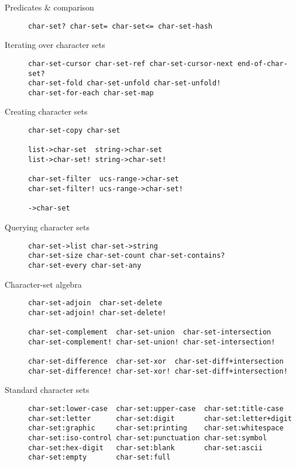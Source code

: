 \begin{description}
\item[ Predicates \& comparison ]
\begin{verbatim}
char-set? char-set= char-set<= char-set-hash
\end{verbatim}
\item[ Iterating over character sets ]
\begin{verbatim}
char-set-cursor char-set-ref char-set-cursor-next end-of-char-set? 
char-set-fold char-set-unfold char-set-unfold!
char-set-for-each char-set-map
\end{verbatim}
\item[ Creating character sets ]
\begin{verbatim}
char-set-copy char-set

list->char-set  string->char-set
list->char-set! string->char-set!
    
char-set-filter  ucs-range->char-set 
char-set-filter! ucs-range->char-set!

->char-set
\end{verbatim}
\item[ Querying character sets ]
\begin{verbatim}
char-set->list char-set->string
char-set-size char-set-count char-set-contains?
char-set-every char-set-any
\end{verbatim}
\item[ Character-set algebra ]
\begin{verbatim}
char-set-adjoin  char-set-delete
char-set-adjoin! char-set-delete!

char-set-complement  char-set-union  char-set-intersection
char-set-complement! char-set-union! char-set-intersection!

char-set-difference  char-set-xor  char-set-diff+intersection
char-set-difference! char-set-xor! char-set-diff+intersection!
\end{verbatim}
\item[ Standard character sets ]
\begin{verbatim}
char-set:lower-case  char-set:upper-case  char-set:title-case
char-set:letter      char-set:digit       char-set:letter+digit
char-set:graphic     char-set:printing    char-set:whitespace
char-set:iso-control char-set:punctuation char-set:symbol
char-set:hex-digit   char-set:blank       char-set:ascii
char-set:empty       char-set:full
\end{verbatim}
\end{description}

